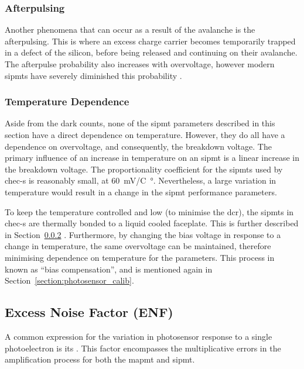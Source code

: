 \subsubsection{Afterpulsing}

Another phenomena that can occur as a result of the avalanche is the afterpulsing. This is where an excess charge carrier becomes temporarily trapped in a defect of the silicon, before being released and continuing on their avalanche. The afterpulse probability also increases with overvoltage, however modern \glspl{sipmt} have severely diminished this probability \cite{Ghassemi2017,SensL2011}.

\subsubsection{Temperature Dependence}

Aside from the dark counts, none of the \gls{sipmt} parameters described in this section have a direct dependence on temperature. However, they do all have a dependence on overvoltage, and consequently, the breakdown voltage. The primary influence of an increase in temperature on an \gls{sipmt} is a linear increase in the breakdown voltage. The proportionality coefficient for the \glspl{sipmt} used by \gls{chec-s} is reasonably small, at \SI{60}{mV/C\degree}. Nevertheless, a large variation in temperature would result in a change in the \gls{sipmt} performance parameters.

To keep the temperature controlled and low (to minimise the \gls{dcr}), the \glspl{sipmt} in \gls{chec-s} are thermally bonded to a liquid cooled faceplate. This is further described in Section~\ref{} . Furthermore, by changing the bias voltage in response to a change in temperature, the same overvoltage can be maintained, therefore minimising dependence on temperature for the parameters. This process in known as ``bias compensation'', and is mentioned again in Section~\ref{section:photosensor_calib}.

\subsection{Excess Noise Factor (ENF)} \label{section:enf}

A common expression for the variation in photosensor response to a single photoelectron is its . This factor encompasses the multiplicative errors in the amplification process for both the \gls{mapmt} and \gls{sipmt}. 

